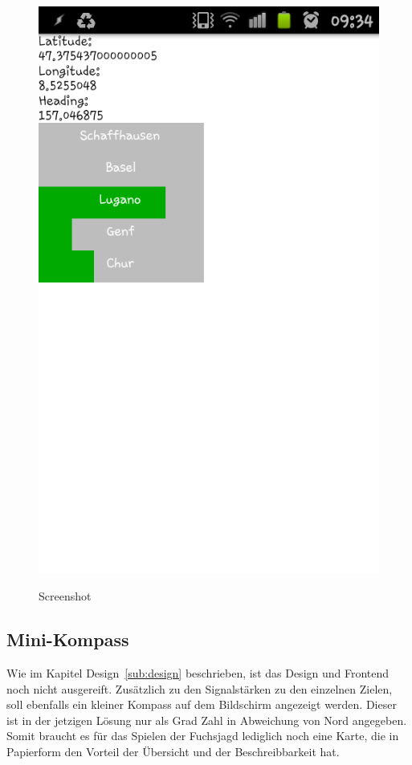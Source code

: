 \begin{figure}[H]
	\centering			      
        \includegraphics[scale=0.50, trim=0mm 15cm 0mm 0mm, clip]{images/screenshot-1.png}\\
		\caption{Screenshot}
	\label{fig:screenshot-1}
\end{figure}

\subsection{Mini-Kompass} %
\label{sub:mini_kompass}
Wie im Kapitel Design~\ref{sub:design} beschrieben, ist das Design und Frontend noch nicht ausgereift. Zusätzlich zu den Signalstärken zu den einzelnen Zielen, soll ebenfalls ein kleiner Kompass auf dem Bildschirm angezeigt werden. Dieser ist in der jetzigen Lösung nur als Grad Zahl in Abweichung von Nord angegeben. Somit braucht es für das Spielen der Fuchsjagd lediglich noch eine Karte, die in Papierform den Vorteil der Übersicht und der Beschreibbarkeit hat.

